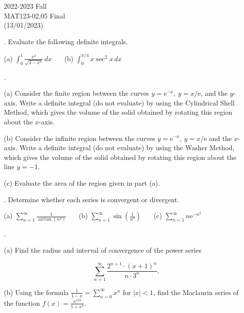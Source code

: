 \documentclass{article}
\begin{document}
\pagestyle{empty}
\large

\begin{center}
2022-2023 Fall \\MAT123-02,05 Final\\(13/01/2023)
\end{center}

. Evaluate the following definite integrals.

\hfill

\noindent (a) $\displaystyle\int_0^1\frac{x^2}{\sqrt{4-x^2}}\,dx$ \ \ \ (b) $\displaystyle\int_0^{\pi/4}x\sec^2x\,dx$

\hfill

.

\hfill

\noindent (a) Consider the finite region between the curves $y=\mathrm{e}^{-x},\:y=x/\mathrm{e}$, and the $y$-axis. Write a definite integral (do not evaluate) by using the Cylindrical Shell Method, which gives the volume of the solid obtained by rotating this region about the $x$-axis.

\hfill

\noindent (b) Consider the infinite region between the curves $y=\mathrm{e}^{-x},\:y=x/\mathrm{e}$ and the $x$-axis. Write a definite integral (do not evaluate) by using the Washer Method, which gives the volume of the solid obtained by rotating this region about the line $y=-1$.

\hfill

\noindent (c) Evaluate the area of the region given in part (a).

\hfill

. Determine whether each series is convergent or divergent.

\hfill

\noindent (a) $\displaystyle\sum_{n=1}^\infty\frac1{\arctan\left(n^2\right)}$ \ \ \ (b) $\displaystyle\sum_{n=1}^\infty\sin\left(\frac1{n^3}\right)$ \ \ \ (c) $\displaystyle\sum_{n=1}^\infty n\mathrm{e}^{-n^2}$

\hfill

.

\hfill

\noindent (a) Find the radius and interval of convergence of the power series

\[\sum_{n=1}^\infty\frac{2^{n+1}\cdot(x+1)^n}{n\cdot3^n}.\]

\hfill

\noindent (b) Using the formula $\displaystyle\frac1{1-x}=\sum_{n=0}^\infty x^n$ for $\left|x\right|<1$, find the Maclaurin series of the function $\displaystyle f(x)=\frac{x^{123}}{1+x^4}$.
\end{document}
